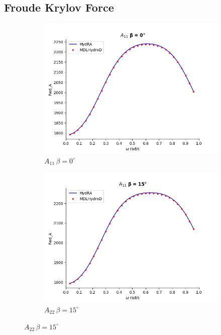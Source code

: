\subsection{Froude Krylov Force}
\begin{figure}[H]
    \centering
    \begin{subfigure}[b]{0.45\textwidth}
        \includegraphics[width=\textwidth]{plots/kcs/added_mass/A11_BETA_0.png}
        \caption{$A_{11}\, \beta=0^{\circ}$}
    \end{subfigure}
    \begin{subfigure}[b]{0.45\textwidth}
        \includegraphics[width=\textwidth]{plots/kcs/added_mass/A11_BETA_15.png}
        \caption{$A_{22} \, \beta = 15^{\circ}$}
    \end{subfigure}
    \label{fig:kcs_addedmass_4}
\end{figure}
